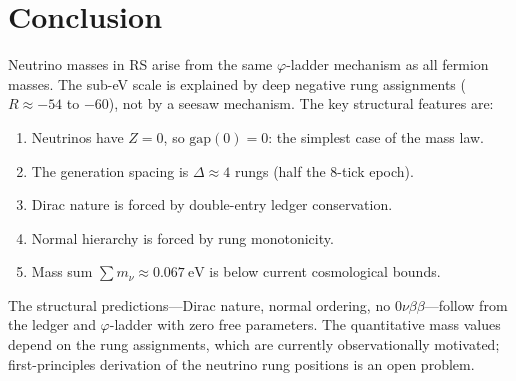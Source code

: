 \documentclass[12pt,a4paper]{article}
\theoremstyle{definition}
\theoremstyle{remark}
\begin{document}
\section{Conclusion}
\label{sec:conclusion}

Neutrino masses in RS arise from the same $\varphi$-ladder
mechanism as all fermion masses.  The sub-eV scale is
explained by deep negative rung assignments ($R \approx -54$
to $-60$), not by a seesaw mechanism.  The key structural
features are:
\begin{enumerate}
  \item Neutrinos have $Z = 0$, so $\mathrm{gap}(0) = 0$:
  the simplest case of the mass law.
  \item The generation spacing is $\Delta \approx 4$ rungs
  (half the 8-tick epoch).
  \item Dirac nature is forced by double-entry ledger
  conservation.
  \item Normal hierarchy is forced by rung monotonicity.
  \item Mass sum $\sum m_\nu \approx 0.067~\mathrm{eV}$
  is below current cosmological bounds.
\end{enumerate}

The structural predictions---Dirac nature, normal ordering,
no $0\nu\beta\beta$---follow from the ledger and
$\varphi$-ladder with zero free parameters.  The
quantitative mass values depend on the rung assignments,
which are currently observationally motivated;
first-principles derivation of the neutrino rung positions
is an open problem.
\end{document}
